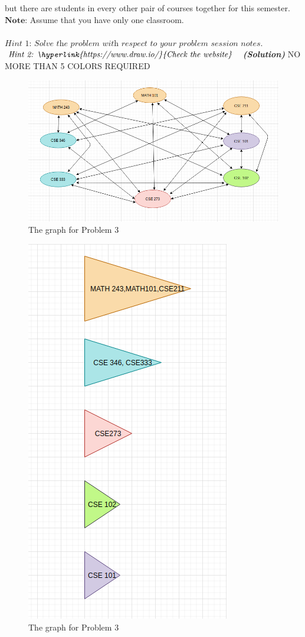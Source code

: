 \documentclass[a4 paper]{article}
\numberwithin{equation}{section}
\newcommand{\solution}{~\newline\textbf{\textit{(Solution)}} }
\newcommand{\0}{\mathbf{0}}
\begin{document}
but there are students in every other pair of courses together for this semester.\\ 
$\textbf{Note:}$ Assume that you have only one classroom.\\ \\
$\textit{Hint 1: Solve the problem with respect to your problem session notes.}$\\
$\textit{Hint 2: \hyperlink{https://www.draw.io/}{Check the website}}$
\newline
\solution
\newline
NO MORE THAN 5 COLORS REQUIRED
\newline
\begin{figure}[htb]
	\centering
	\includegraphics[scale=0.5]{graphcolor.png}
	\caption{The graph for Problem 3}
	\label{fig:graph}
\end{figure}
\newpage
\begin{figure}[htb]
	\centering
	\includegraphics[scale=0.5]{numbercolor.png}
	\caption{The graph for Problem 3}
	\label{fig:graph}
\end{figure}
\end{document}
